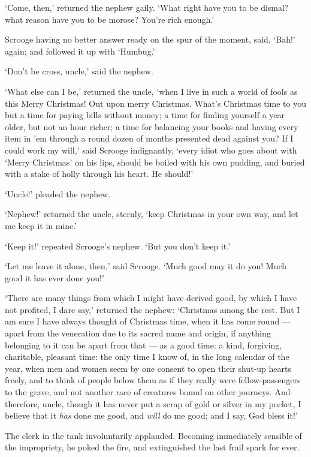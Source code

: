 \documentclass[11pt,twoside]{article}\makeatletter
\begin{document}
‘Come, then,’ returned the nephew gaily.  ‘What right have you to be dismal?  what reason have you to be morose? You're rich enough.’\par
Scrooge having no better answer ready on the spur of the moment, said, ‘Bah!’ again; and followed it up with  ‘Humbug.’\par
‘Don't be cross, uncle,’ said the nephew.  \par
‘What else can I be,’ returned the uncle, ‘when I live in such a world of fools as this  Merry Christmas!  Out upon merry Christmas.  What's Christmas time to you but a time for  paying bills without money; a time for finding yourself a year older, but not an hour richer; a time for balancing your books and having every item in 'em through a round dozen of months presented dead against you?  If I could work my will,’ said Scrooge indignantly, ‘every idiot who goes about with ‘Merry Christmas’ on his lips, should be boiled with his own pudding, and buried with a stake of holly through his heart.  He should!’\par
‘Uncle!’ pleaded the nephew.  \par
‘Nephew!’ returned the uncle, sternly, ‘keep Christmas in your own way, and let me keep it in mine.’\par
‘Keep it!’ repeated Scrooge's nephew.  ‘But you don't keep it.’\par
‘Let me leave it alone, then,’ said Scrooge.  ‘Much good may it do you!  Much good it has ever done you!’\par
‘There are many things from which I might have derived good, by which I have not profited, I dare say,’ returned the nephew:  ‘Christmas among the rest.  But I am sure I have always thought of Christmas time, when it has come round  — apart from the veneration due to its sacred name and origin, if anything belonging to it can be apart from that — as a good time: a kind, forgiving, charitable, pleasant time: the only time I know of, in the long calendar of the year, when men and women seem by one consent to open their shut-up hearts freely, and to think of people below them as if they really were fellow-passengers to the grave, and not another race of creatures bound on other journeys.  And therefore, uncle, though it has never put a scrap of gold or silver in my pocket, I believe that it \textit{has} done me good, and \textit{will} do me good; and I say, God bless it!’\par
The clerk in the tank involuntarily applauded.  Becoming immediately sensible of the impropriety, he poked the fire, and extinguished the last frail spark for ever.  \par
\end{document}
